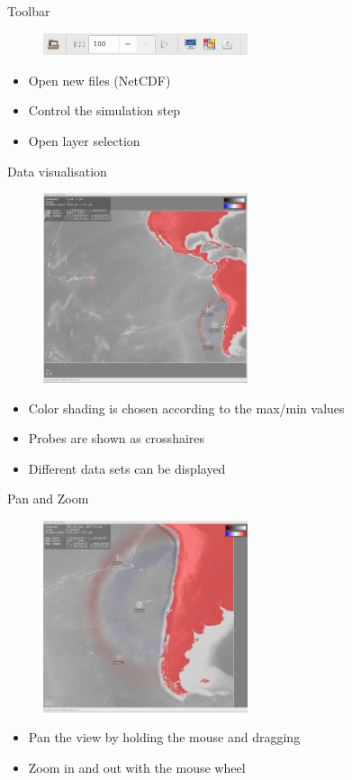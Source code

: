 \documentclass[shortpres,usenames,dvipsnames]{beamer}
\begin{document}
\begin{frame}[fragile]{Toolbar}
	\begin{figure}
		\includegraphics[clip, width=60mm]{img/toolbar.png}
	\end{figure}
	\begin{itemize}
		\item Open new files (NetCDF)
		\item Control the simulation step
		\item Open layer selection
	\end{itemize}
\end{frame}

\begin{frame}[fragile]{Data visualisation}
	\begin{figure}
		\includegraphics[clip, width=60mm]{img/datavis.png}
	\end{figure}
	\begin{itemize}
		\item Color shading is chosen according to the max/min values
		\item Probes are shown as crosshaires
		\item Different data sets can be displayed
	\end{itemize}
\end{frame}

\begin{frame}[fragile]{Pan and Zoom}
	\begin{figure}
		\includegraphics[clip, width=60mm]{img/zoom.png}
	\end{figure}
	\begin{itemize}
		\item Pan the view by holding the mouse and dragging
		\item Zoom in and out with the mouse wheel
	\end{itemize}
\end{frame}
\end{document}

